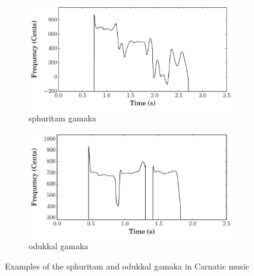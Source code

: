 	
\begin{figure}[h]
	\begin{subfigure}{\textwidth}
		\centering
		\includegraphics[width=\figSizeSeventy]{ch02_background/figures/Sphuritam_on_M1_Raga_Arabhi.pdf}
		\caption{\Gls{sphuritam} \gls{gamaka}\protect\footnotemark}
		\label{fig:sphuritam_todi}
	\end{subfigure}
	\begin{subfigure}{\textwidth}
		\centering		
		\includegraphics[width=\figSizeSeventy]{ch02_background/figures/Odukkal_on_D1.pdf}
		\caption{\Gls{odukkal} \gls{gamaka}\protect\footnotemark}
		\label{fig:odukkal_todi}
	\end{subfigure}
	\caption[Examples of \gls{gamaka} in Carnatic music]{Examples of the \gls{sphuritam} and \gls{odukkal} \gls{gamaka} in Carnatic music}
	\label{fig:example_sphuritam_odukkal}
\end{figure}



